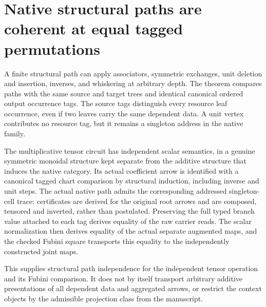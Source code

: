 \documentclass{article}
\begin{document}
\section*{Native structural paths are coherent at equal tagged permutations}
A finite structural path can apply associators, symmetric exchanges,
unit deletion and insertion, inverses, and whiskering at arbitrary
depth. The theorem compares paths with the same source and target
trees and identical canonical ordered output occurrence tags. The
source tags distinguish every resource leaf occurrence, even if two
leaves carry the same dependent data. A unit vertex contributes no
resource tag, but it remains a singleton address in the native family.

The multiplicative tensor circuit has independent scalar semantics,
in a genuine symmetric monoidal structure kept separate from the
additive structure that induces the native category. Its actual
coefficient arrow is identified with a canonical tagged chart
comparison by structural induction, including inverse and unit
steps. The actual native path admits the corresponding addressed
singleton-cell trace: certificates are derived for the original
root arrows and are composed, tensored and inverted, rather than
postulated. Preserving the full typed branch value attached to
each tag derives equality of the raw carrier reads. The scalar
normalization then derives equality of the actual separate
augmented maps, and the checked Fubini square transports this
equality to the independently constructed joint maps.

This supplies structural path independence for the independent
tensor operation and its Fubini comparison. It does not by itself
transport arbitrary additive presentations of all dependent data
and aggregated arrows, or restrict the context objects by the
admissible projection class from the manuscript.
\end{document}
